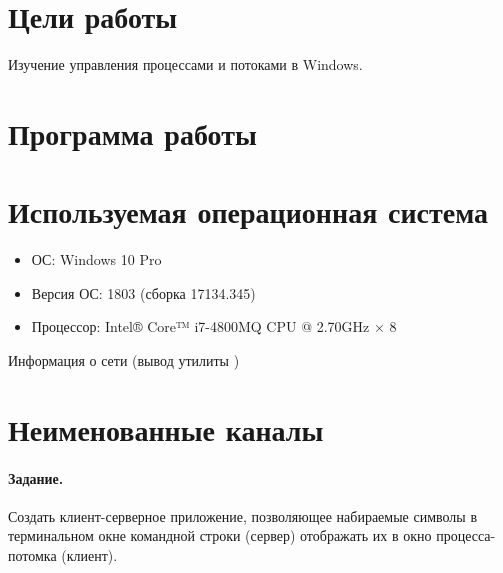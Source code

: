 





\tableofcontents
\newpage

\section{Цели работы}

Изучение управления процессами и потоками в Windows.

\section{Программа работы}



\section{Используемая операционная система}

\begin{itemize}
	\item ОС: Windows 10 Pro
	\item Версия ОС: 1803 (сборка 17134.345)
	\item Процессор: Intel® Core™ i7-4800MQ CPU @ 2.70GHz × 8
\end{itemize}

\noindent Информация о сети (вывод утилиты )



\newpage

\section{Неименованные каналы}

\paragraph{Задание.} Создать клиент-серверное приложение, позволяющее набираемые символы в терминальном окне командной строки (сервер) отображать их в окно процесса-потомка (клиент).





